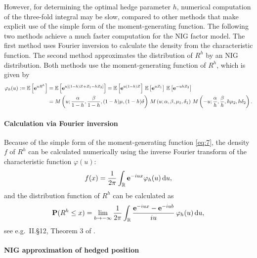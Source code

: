 However, for determining the optimal hedge parameter $h$, numerical
computation of the three-fold integral may be slow, compared to other
methods that make explicit use of the simple form of the
moment-generating function.  The following two methods achieve a much
faster computation for the NIG factor model.  The first method uses
Fourier inversion to calculate the density from the characteristic
function. The second method approximates the distribution of $R^h$ by
an NIG distribution.  Both methods use the moment-generating function
of $R^h$, which is given by
\begin{align}
  \varphi_h(u):=\E\left[\e^{u R^h}\right]
  &= \E\left[ \e^{u[(1-h) Z + Z_1 -h Z_2]}\right] %
    = \E\left[ \e^{u(1-h) Z}\right]\, \E\left[ \e^{u Z_1}\right] \,
    \E\left[ \e^{-u h Z_2}\right]\nonumber\\
  &=M\left(u;\frac{\alpha}{1-h}, \frac{\beta}{1-h}, (1-h)\mu,
    (1-h)\delta\right)\,
    M\left(u; \alpha, \beta, \mu_1, \delta_1\right)\,
    M\left(-u; \frac{\alpha}{h}, \frac{\beta}{h}, h\mu_2,
    h\delta_2\right).
    \label{eq:7}
\end{align}



\paragraph*{Calculation via Fourier inversion}
\label{sec:calc-via-four}

Because of the simple form of the moment-generating function
\eqref{eq:7}, the density $f$ of $R^h$ can be calculated numerically
using the inverse Fourier transform of the characteristic function
$\varphi(u) $:
\begin{equation*}
  f(x) = \frac{1}{2\pi} \int_{\mathbb{R}} {\bf e}^{-i u x} \varphi_h(u)\, {\rm d} u, 
\end{equation*}
and the distribution function of $R^h$ can be calculated as
\begin{equation*}
  {\bf P}(R^h\leq x) = \lim_{b\rightarrow-\infty} \frac{1}{2\pi} \int_{\mathbb{R}}
  \frac{{\bf e}^{-i u x} - {\bf e}^{-i u b}}{i u}\, \varphi_h(u)\, {\rm d} u,
\end{equation*}
see e.g.\ II.\S 12, Theorem 3 of \citep{Shiryaev1996}.


\paragraph*{NIG approximation of hedged position}
\label{sec:nig-appr-hedg}

